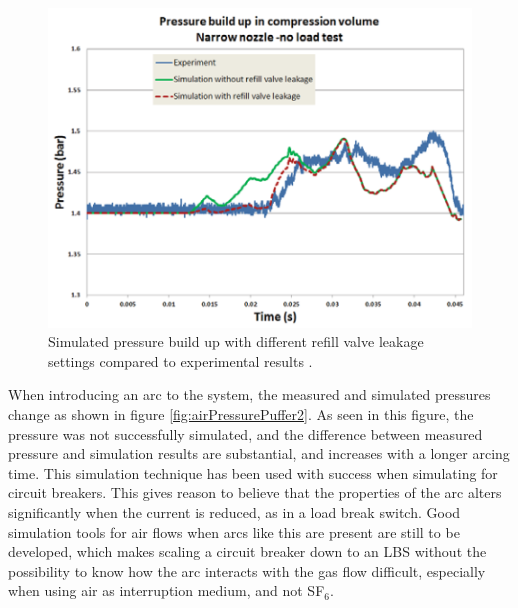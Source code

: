 \documentclass[10pt,b5paper,twoside]{article}
\begin{document}
\begin{figure} [H]
\centering
\includegraphics[scale=0.65]{Bilder/Theory/tankPressure.png}
\caption{Simulated pressure build up with different refill valve leakage settings compared to experimental results  \cite{bib:CBAC}.} \label{fig:airPressurePuffer}
\end{figure}

When introducing an arc to the system, the measured and simulated pressures change as shown in figure \ref{fig:airPressurePuffer2}. As seen in this figure, the pressure was not successfully simulated, and the difference between measured pressure and simulation results are substantial, and increases with a longer arcing time. This simulation technique has been used with success when simulating for circuit breakers. This gives reason to believe that the properties of the arc alters significantly when the current is reduced, as in a load break switch. Good simulation tools for air flows when arcs like this are present are still to be developed, which makes scaling a circuit breaker down to an LBS without the possibility to know how the arc interacts with the gas flow difficult, especially when using air as interruption medium, and not SF$_6$.
\end{document}
